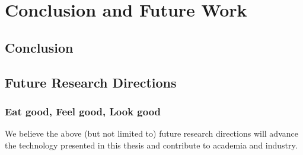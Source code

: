 \chapter{Conclusion and Future Work}
\label{ch:concl}

\section{Conclusion}

\lipsum[1-2]

\section{Future Research Directions}

\lipsum[4]

\subsection{Eat good, Feel good, Look good}

\lipsum[5]

\vspace{2em}

We believe the above (but not limited to) future research directions will advance the technology presented in this thesis and contribute to academia and industry.
